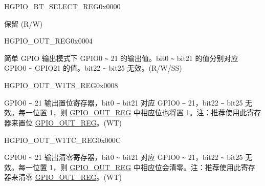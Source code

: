 \begin{register}{H}{GPIO\_BT\_SELECT\_REG}{0x0000}\label{regdesc:GPIOBTSELECTREG}
%
\regnewline%
\begin{regdesc}\begin{reglist}
\label{fielddesc:GPIOBTSEL}\item [GPIO\_BT\_SEL] 保留 (R/W)
\end{reglist}\end{regdesc}
\end{register}


\begin{register}{H}{GPIO\_OUT\_REG}{0x0004}\label{regdesc:GPIOOUTREG}
%
%
\regnewline%
\begin{regdesc}\begin{reglist}
\label{fielddesc:GPIOOUTDATAORIG}\item [GPIO\_OUT\_DATA\_ORIG] 简单 GPIO 输出模式下 GPIO0 \verb+~+ 21 的输出值。bit0 \verb+~+ bit21 的值分别对应 GPIO0 \verb+~+ GPIO21 的值。bit22 \verb+~+ bit25 无效。(R/W/SS)
\end{reglist}\end{regdesc}
\end{register}


\begin{register}{H}{GPIO\_OUT\_W1TS\_REG}{0x0008}\label{regdesc:GPIOOUTW1TSREG}
%
%
\regnewline%
\begin{regdesc}\begin{reglist}
\label{fielddesc:GPIOOUTW1TS}\item [GPIO\_OUT\_W1TS] GPIO0 \verb+~+ 21 输出置位寄存器，bit0 \verb+~+ bit21 对应 GPIO0 \verb+~+ 21，bit22 \verb+~+ bit25 无效。每一位置 1，则 \hyperref[regdesc:GPIOOUTREG]{GPIO\_OUT\_REG} 中相应位也将置 1。注：推荐使用此寄存器来置位 \hyperref[regdesc:GPIOOUTREG]{GPIO\_OUT\_REG}。(WT)
\end{reglist}\end{regdesc}
\end{register}

\begin{register}{H}{GPIO\_OUT\_W1TC\_REG}{0x000C}\label{regdesc:GPIOOUTW1TCREG}
%
%
\regnewline%
\begin{regdesc}\begin{reglist}
\label{fielddesc:GPIOOUTW1TC}\item [GPIO\_OUT\_W1TC] GPIO0 \verb+~+ 21 输出清零寄存器，bit0 \verb+~+ bit21 对应 GPIO0 \verb+~+ 21，bit22 \verb+~+ bit25 无效。每一位置 1，则 \hyperref[regdesc:GPIOOUTREG]{GPIO\_OUT\_REG} 中相应位会清零。注：推荐使用此寄存器来清零 \hyperref[regdesc:GPIOOUTREG]{GPIO\_OUT\_REG}。(WT)
\end{reglist}\end{regdesc}
\end{register}


